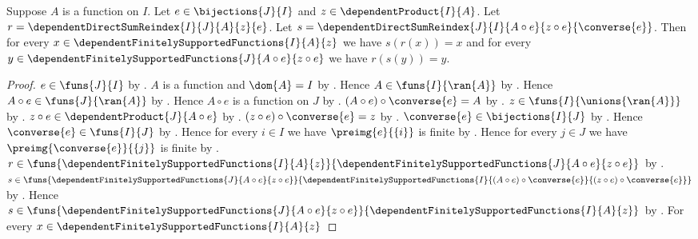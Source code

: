\begin{proposition}\label{spike_bijective_direct_sum_reindex_inverse}
    Suppose $A$ is a function on $I$.
    Let $e\in\bijections{J}{I}$ and
        $z\in\dependentProduct{I}{A}$.
    Let $r=\dependentDirectSumReindex{I}{J}{A}{z}{e}$.
    Let
        $s=\dependentDirectSumReindex
            {J}{I}{A\circ e}{z\circ e}{\converse{e}}$.
    Then for every
        $x\in\dependentFinitelySupportedFunctions{I}{A}{z}$
    we have $s(r(x))=x$ and for every
        $y\in\dependentFinitelySupportedFunctions
            {J}{A\circ e}{z\circ e}$
    we have $r(s(y))=y$.
\end{proposition}
\begin{proof}
    $e\in\funs{J}{I}$ by .
    $A$ is a function and $\dom{A}=I$ by \auto.
    Hence $A\in\funs{I}{\ran{A}}$ by
        .
    Hence $A\circ e\in\funs{J}{\ran{A}}$ by .
    Hence $A\circ e$ is a function on $J$ by
        .
    $(A\circ e)\circ\converse{e}=A$ by
        .
    $z\in\funs{I}{\unions{\ran{A}}}$ by
        .
    $z\circ e\in\dependentProduct{J}{A\circ e}$ by
        .
    $(z\circ e)\circ\converse{e}=z$ by
        .
    $\converse{e}\in\bijections{I}{J}$ by
        .
    Hence $\converse{e}\in\funs{I}{J}$ by
        .
    Hence for every $i\in I$ we have
        $\preimg{e}{\{i\}}$ is finite by
        .
    Hence for every $j\in J$ we have
        $\preimg{\converse{e}}{\{j\}}$ is finite by
        .
    $r\in\funs{
        \dependentFinitelySupportedFunctions{I}{A}{z}}{
        \dependentFinitelySupportedFunctions
            {J}{A\circ e}{z\circ e}}$ by
        .
    $s\in\funs{
        \dependentFinitelySupportedFunctions
            {J}{A\circ e}{z\circ e}}{
        \dependentFinitelySupportedFunctions
            {I}{(A\circ e)\circ\converse{e}}{
                (z\circ e)\circ\converse{e}}}$ by
        .
    Hence $s\in\funs{
        \dependentFinitelySupportedFunctions
            {J}{A\circ e}{z\circ e}}{
        \dependentFinitelySupportedFunctions{I}{A}{z}}$ by
        \auto.
    For every
        $x\in\dependentFinitelySupportedFunctions{I}{A}{z}$

\end{proof}

